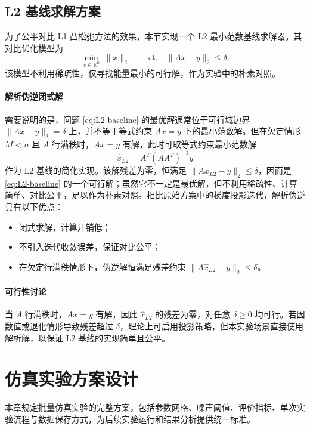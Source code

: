 \documentclass[UTF8]{ctexart}
\numberwithin{figure}{section}
\theoremstyle{definition}
\theoremstyle{examplestyle}
\theoremstyle{remark}
\begin{document}
\subsection{L2 基线求解方案}
\label{sec:l2-baseline}

为了公平对比 L1 凸松弛方法的效果，本节实现一个 L2 最小范数基线求解器。其对比优化模型为
\begin{equation}
\label{eq:L2-baseline}
\min_{x\in\mathbb{R}^n}\ \|x\|_2 \qquad \text{s.t.} \quad \|Ax-y\|_2\le\delta.
\end{equation}
该模型不利用稀疏性，仅寻找能量最小的可行解，作为实验中的朴素对照。

\paragraph*{解析伪逆闭式解}
需要说明的是，问题 \eqref{eq:L2-baseline} 的最优解通常位于可行域边界 $\|Ax-y\|_2=\delta$ 上，并不等于等式约束 $Ax=y$ 下的最小范数解。但在欠定情形 $M<n$ 且 $A$ 行满秩时，$Ax=y$ 有解，此时可取等式约束最小范数解
\begin{equation}
\label{eq:l2-pinv}
\hat{x}_{L2}=A^T(AA^T)^{-1}y
\end{equation}
作为 L2 基线的简化实现。该解残差为零，恒满足 $\|A\hat{x}_{L2}-y\|_2\le\delta$，因而是 \eqref{eq:L2-baseline} 的一个可行解；虽然它不一定是最优解，但不利用稀疏性、计算简单、对比公平，足以作为朴素对照。相比原始方案中的梯度投影迭代，解析伪逆具有以下优点：
\begin{itemize}
\item 闭式求解，计算开销低；
\item 不引入迭代收敛误差，保证对比公平；
\item 在欠定行满秩情形下，伪逆解恒满足残差约束 $\|A\hat{x}_{L2}-y\|_2\le\delta$。
\end{itemize}

\paragraph*{可行性讨论}
当 $A$ 行满秩时，$Ax=y$ 有解，因此 $\hat{x}_{L2}$ 的残差为零，对任意 $\delta\ge0$ 均可行。若因数值或退化情形导致残差超过 $\delta$，理论上可启用投影策略，但本实验场景直接使用解析解，以保证 L2 基线的实现简单且公平。

\section{仿真实验方案设计}
本章规定批量仿真实验的完整方案，包括参数网格、噪声阈值、评价指标、单次实验流程与数据保存方式，为后续实验运行和结果分析提供统一标准。
\end{document}

